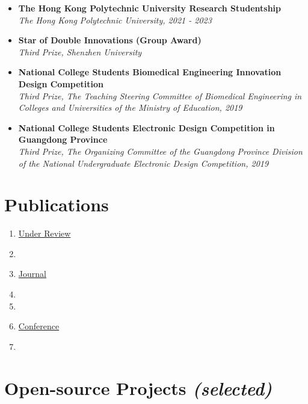 \documentclass[letterpaper,11pt]{article}
\begin{document}
    \begin{itemize}[leftmargin=0.15in, label={}, itemsep=0em]
        \item \textbf{The Hong Kong Polytechnic University Research Studentship}\\
        \emph{The Hong Kong Polytechnic University, 2021 - 2023}
        \item \textbf{Star of Double Innovations (Group Award)}\\
        \emph{Third Prize, Shenzhen University}
        \item \textbf{National College Students Biomedical Engineering Innovation Design Competition}\\
        \emph{Third Prize, The Teaching Steering Committee of Biomedical Engineering in Colleges and Universities of the Ministry of Education, 2019}
        \item \textbf{National College Students Electronic Design Competition in Guangdong Province}\\
        \emph{Third Prize, The Organizing Committee of the Guangdong Province Division of the National Undergraduate Electronic Design Competition, 2019}
    \end{itemize}

    \section{Publications}

    

    \begin{enumerate}[leftmargin=0.15in, label={}, itemsep=0em]
        \item \underline{Under Review}
        \item {}
        
        \item \underline{Journal}
        \item {}
        \item {}
        
        \item \underline{Conference}
        \item {}
     \end{enumerate}

    \section{Open-source Projects \emph{(selected)}}
\end{document}
